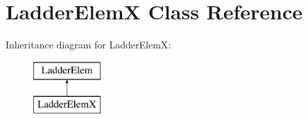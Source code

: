 \hypertarget{class_ladder_elem_x}{\section{Ladder\-Elem\-X Class Reference}
\label{class_ladder_elem_x}
}
Inheritance diagram for Ladder\-Elem\-X\-:\begin{figure}[H]
\begin{center}
\leavevmode
\includegraphics[height=2.000000cm]{class_ladder_elem_x}
\end{center}
\end{figure}
